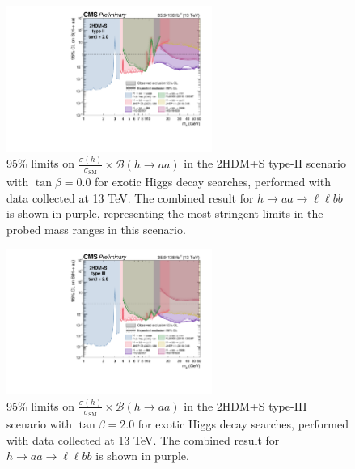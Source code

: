   \begin{figure}[h]
    \begin{center}
      \includegraphics[width=0.6\textwidth]{figures/ch-10-results/summary_plot_full_run2_plot_BRaa_Type2_tanbeta2.pdf}
    \end{center}
    \caption[95\% limits on $\frac{\sigma(h)}{\sigma_{\text{SM}}} \times \mathcal{B}(h \rightarrow aa)$ in the 2HDM+S type-II scenario with $\tan\beta = 2.0$ for exotic Higgs decay searches, performed with data collected at 13 TeV.]{95\% limits on $\frac{\sigma(h)}{\sigma_{\text{SM}}} \times \mathcal{B}(h \rightarrow aa)$ in the 2HDM+S type-II scenario with $\tan\beta = 0.0$ for exotic Higgs decay searches, performed with data collected at 13 TeV. The combined result for $h\rightarrow aa \rightarrow \ell\ell bb$ \cite{CMS-HIG-22-007} is shown in purple, representing the most stringent limits in the probed mass ranges in this scenario.}
      \label{fig:summary_plot_typeII_tan_beta_2p0}
  \end{figure}
  \begin{figure}[h]
    \begin{center}
      \includegraphics[width=0.6\textwidth]{figures/ch-10-results/summary_plot_full_run2_plot_BRaa_Type3_tanbeta2.pdf}
    \end{center}
    \caption[95\% limits on $\frac{\sigma(h)}{\sigma_{\text{SM}}} \times \mathcal{B}(h \rightarrow aa)$ in the 2HDM+S type-III scenario with $\tan\beta = 2.0$ for exotic Higgs decay searches, performed with data collected at 13 TeV.]{95\% limits on $\frac{\sigma(h)}{\sigma_{\text{SM}}} \times \mathcal{B}(h \rightarrow aa)$ in the 2HDM+S type-III scenario with $\tan\beta = 2.0$ for exotic Higgs decay searches, performed with data collected at 13 TeV. The combined result for $h\rightarrow aa \rightarrow \ell\ell bb$ \cite{CMS-HIG-22-007} is shown in purple.}
      \label{fig:summary_plot_typeIII_tan_beta_2p0}
  \end{figure}
  
